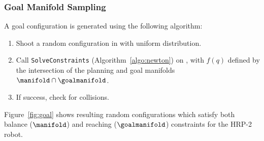 \subsubsection{Goal Manifold Sampling}
\label{subsubsec:chap2-goal-sampling}

A goal configuration is generated using the following algorithm:
\begin{enumerate}
\item Shoot a random configuration  in \cspace with
  uniform distribution.
\item Call \texttt{SolveConstraints} (Algorithm~\ref{algo:newton}) on
  , with $f(q)$ defined by the intersection of the planning
  and goal manifolds $\manifold \cap \goalmanifold$.
\item If success, check for collisions.
\end{enumerate}

Figure~\ref{fig:goal} shows resulting random configurations which
satisfy both balance ($\manifold$) and reaching ($\goalmanifold$)
constraints for the HRP-2 robot.

